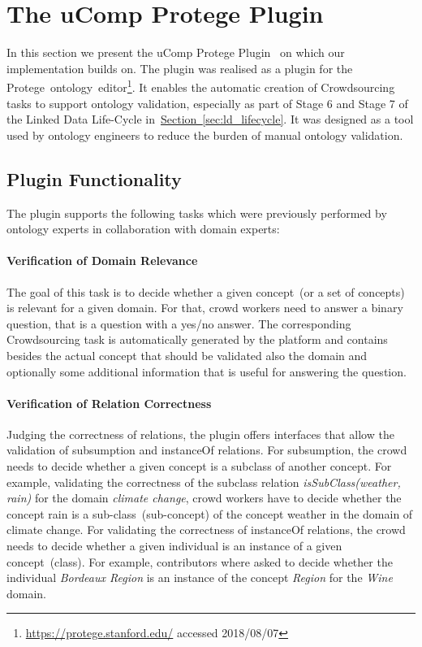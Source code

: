 
\section{The uComp Protege Plugin}\label{sec:ucomp_protege_plugin}
In this section we present the uComp Protege Plugin~\cite{wohlgenannt2016} on which our implementation builds on. The plugin was realised as a plugin for the Protege~ontology~editor\footnote{\url{https://protege.stanford.edu/} accessed 2018/08/07}. It enables the automatic creation of Crowdsourcing tasks to support ontology validation, especially as part of Stage 6 and Stage 7 of the Linked Data Life-Cycle in~\hyperref[sec:ld_lifecycle]{Section~\ref*{sec:ld_lifecycle}}. It was designed as a tool used by ontology engineers to reduce the burden of manual ontology validation.

\subsection{Plugin Functionality}\label{sec:ucomp_protege_plugin_functionality}
The plugin supports the following tasks which were previously performed by ontology experts in collaboration with domain experts:

\paragraph{Verification of Domain Relevance}
The goal of this task is to decide whether a given concept~(or a set of concepts) is relevant for a given domain. For that, crowd workers need to
answer a binary question, that is a question with a yes/no answer. The corresponding Crowdsourcing task is automatically generated by the platform and
contains besides the actual concept that should be validated also the domain and optionally some additional information that is useful for answering 
the question. 

\paragraph{Verification of Relation Correctness}
Judging the correctness of relations, the plugin offers interfaces that allow the validation of subsumption and instanceOf relations. 
For subsumption, the crowd needs to decide whether a given concept is a subclass of another concept. For example, validating the correctness
of the subclass relation \emph{isSubClass(weather, rain)} for the domain \emph{climate change}, crowd workers have to decide whether the concept rain is a sub-class~(sub-concept) of the concept weather in the domain of climate change. For validating the correctness of instanceOf relations, the crowd needs to decide whether a given individual is an instance of a given concept~(class). For example, contributors where asked to decide whether the individual \emph{Bordeaux Region} is an instance of the concept \emph{Region} for the \emph{Wine} domain. 


